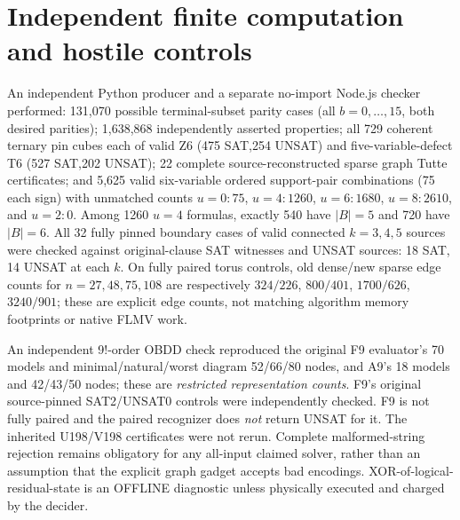 \documentclass[11pt]{article}
\begin{document}
\section{Independent finite computation and hostile controls}
An independent Python producer and a separate no-import Node.js checker performed: 131,070 possible terminal-subset parity cases (all $b=0,\dots,15$, both desired parities); 1,638,868 independently asserted properties; all 729 coherent ternary pin cubes each of valid Z6 (475 SAT,254 UNSAT) and five-variable-defect T6 (527 SAT,202 UNSAT); 22 complete source-reconstructed sparse graph Tutte certificates; and 5,625 valid six-variable ordered support-pair combinations (75 each sign) with unmatched counts $u=0:75$, $u=4:1260$, $u=6:1680$, $u=8:2610$, and $u=2:0$. Among 1260 $u=4$ formulas, exactly 540 have $|B|=5$ and 720 have $|B|=6$. All 32 fully pinned boundary cases of valid connected $k=3,4,5$ sources were checked against original-clause SAT witnesses and UNSAT sources: 18 SAT, 14 UNSAT at each $k$. On fully paired torus controls, old dense/new sparse edge counts for $n=27,48,75,108$ are respectively $324/226$, $800/401$, $1700/626$, $3240/901$; these are explicit edge counts, not matching algorithm memory footprints or native FLMV work.

An independent 9!-order OBDD check reproduced the original F9 evaluator's 70 models and minimal/natural/worst diagram 52/66/80 nodes, and A9's 18 models and 42/43/50 nodes; these are \emph{restricted representation counts}. F9's original source-pinned SAT2/UNSAT0 controls were independently checked. F9 is not fully paired and the paired recognizer does \emph{not} return UNSAT for it. The inherited U198/V198 certificates were not rerun. Complete malformed-string rejection remains obligatory for any all-input claimed solver, rather than an assumption that the explicit graph gadget accepts bad encodings. XOR-of-logical-residual-state is an OFFLINE diagnostic unless physically executed and charged by the decider.
\end{document}
